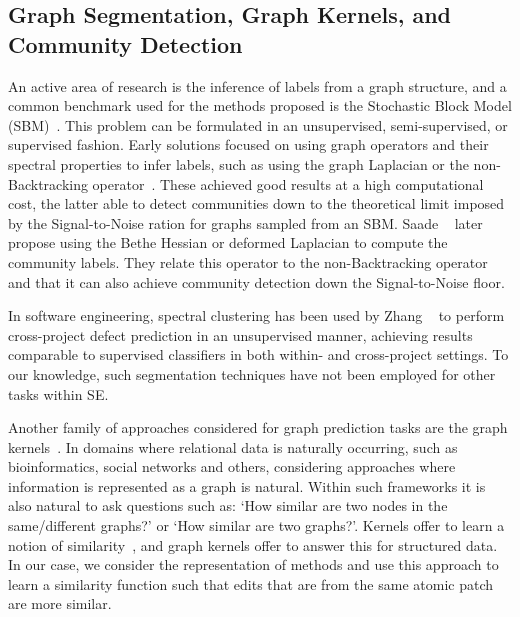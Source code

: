 \subsection{Graph Segmentation, Graph Kernels, and Community Detection}
\label{chapter:literature:sec:flexeme_rel_work:graph_seg}


An active area of research is the inference of labels from a graph structure,
and a common benchmark used for the methods proposed is the Stochastic Block
Model (SBM)~\cite{HOLLAND1983}. This problem can be formulated in an
unsupervised, semi-supervised, or supervised fashion. Early solutions focused on
using graph operators and their spectral properties to infer labels, such as
using the graph Laplacian or the non-Backtracking operator~\cite{Krzakala2013}.
These achieved good results at a high computational cost, the latter able to
detect communities down to the theoretical limit imposed by the Signal-to-Noise
ration for graphs sampled from an SBM. Saade \etal~\cite{Saade2014} later
propose using the Bethe Hessian or deformed Laplacian to compute the community
labels. They relate this operator to the non-Backtracking operator and that it
can also achieve community detection down the Signal-to-Noise floor.

In software engineering, spectral clustering has been used by Zhang
\etal~\cite{Zhang2016} to perform cross-project defect prediction in an
unsupervised manner, achieving results comparable to supervised classifiers in
both within- and cross-project settings. To our knowledge, such segmentation
techniques have not been employed for other tasks within SE.

Another family of approaches considered for graph prediction tasks are the graph
kernels~\cite{vishwanathan2010graph}. In domains where relational data is
naturally occurring, such as bioinformatics, social networks and others,
considering approaches where information is represented as a graph is natural.
Within such frameworks it is also natural to ask questions such as: `How similar
are two nodes in the same/different graphs?' or `How similar are two graphs?'.
Kernels offer to learn a notion of similarity~\cite{smola1998learning}, and
graph kernels offer to answer this for structured data. In our case, we consider
the \deltaPDGN representation of methods and use this approach to learn a
similarity function such that edits that are from the same atomic patch are more
similar.

